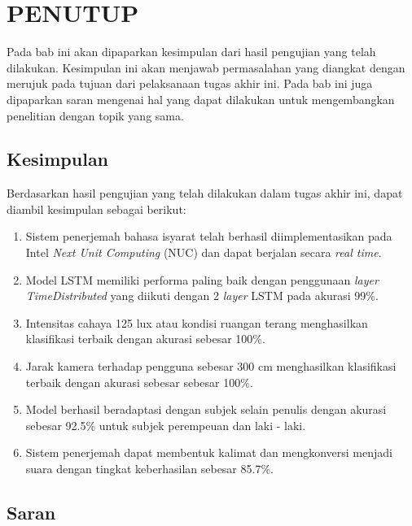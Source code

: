 \chapter{PENUTUP}
\label{chap:penutup}

Pada bab ini akan dipaparkan kesimpulan dari hasil pengujian yang telah dilakukan. Kesimpulan ini akan menjawab permasalahan yang diangkat dengan merujuk pada tujuan dari pelaksanaan tugas akhir ini. Pada bab ini juga dipaparkan saran mengenai hal yang dapat dilakukan untuk mengembangkan penelitian dengan topik yang sama.

\section{Kesimpulan}
\label{sec:kesimpulan}

Berdasarkan hasil pengujian yang telah dilakukan dalam tugas akhir ini, dapat diambil kesimpulan sebagai berikut:

\begin{enumerate}[nolistsep]
  
  \item Sistem penerjemah bahasa isyarat telah berhasil diimplementasikan pada Intel \emph{Next Unit Computing} (NUC) dan dapat berjalan secara \emph{real time}. 
  \item Model LSTM memiliki performa paling baik dengan penggunaan \emph{layer TimeDistributed} yang diikuti dengan 2 \emph{layer} LSTM pada akurasi 99\%.
  \item Intensitas cahaya 125 lux atau kondisi ruangan terang menghasilkan klasifikasi terbaik dengan akurasi sebesar 100\%.
  \item Jarak kamera terhadap pengguna sebesar 300 cm menghasilkan klasifikasi terbaik dengan akurasi sebesar sebesar 100\%.
  \item Model berhasil beradaptasi dengan subjek selain penulis dengan akurasi sebesar 92.5\% untuk subjek perempeuan dan laki - laki.
  \item Sistem penerjemah dapat membentuk kalimat dan mengkonversi menjadi suara dengan tingkat keberhasilan sebesar 85.7\%.


\end{enumerate}

\section{Saran}
\label{chap:saran}

